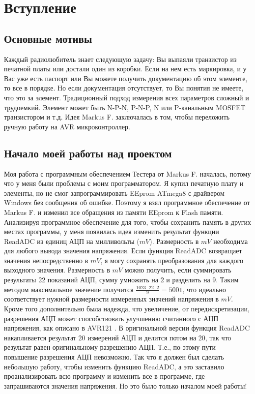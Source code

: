 \newpage
\section*{Вступление}
\subsection*{Основные мотивы}

Каждый радиолюбитель знает следующую задачу: Вы выпаяли транзистор из печатной платы или достали один из коробки. 
Если на нем есть маркировка, и у Вас уже есть паспорт или Вы можете получить документацию об этом элементе, то все 
в порядке. Но если документация отсутствует, то Вы понятия не имеете, что это за элемент. Традиционный подход измерения 
всех параметров сложный и трудоемкий. Элемент может быть N-P-N, P-N-P, N или P-канальным MOSFET транзистором и т.д. 
Идея Markus F. заключалась в том, чтобы переложить ручную работу на AVR микроконтроллер.
\subsection*{Начало моей работы над проектом}

Моя работа с программным обеспечением Тестера от Markus F.\cite{Frejek} началась, потому что у меня были проблемы с 
моим программатором. Я купил печатную плату и элементы, но не смог запрограммировать EEprom ATmega8 с драйвером Windows 
без сообщения об ошибке. Поэтому я взял программное обеспечение от Markus F. и изменил все обращения из памяти EEprom 
к Flash памяти. Анализируя программное обеспечение для того, чтобы сохранить память в других местах программы, у меня 
появилась идея изменить результат функции ReadADC из единиц АЦП на милливольты (\(mV\)). Размерность в \(mV\) необходима 
для любого вывода значения напряжения. Если функция ReadADC возвращает значения непосредственно в \(mV\), я могу 
сохранять преобразования для каждого выходного значения. Размерность в \(mV\) можно получить, если суммировать 
результаты 22 показаний АЦП, сумму умножить на 2 и разделить на 9. Таким методом максимальное значение получится 
\begin{math}\frac{1023\cdot22\cdot2}{9} = 5001\end{math},  что идеально соответствует нужной размерности измеренных 
значений напряжения в \(mV\). Кроме того дополнительно была надежда, что увеличение, от передискретизации, 
разрешения АЦП может способствовать улучшению считанного с АЦП напряжения, как описано в AVR121 \cite{AVR121}. 
В оригинальной версии функция ReadADC накапливается результат 20 измерений АЦП и делится потом на 20, так что результат 
равен оригинальному разрешению АЦП. Т.е., по этому пути повышение разрешения АЦП невозможно. Так что я должен был 
сделать небольшую работу, чтобы изменить функцию ReadADC, а это заставило проанализировать всю программу и изменить все 
 в программе, где запрашиваются значения напряжения. Но это было только началом моей работы!\\

